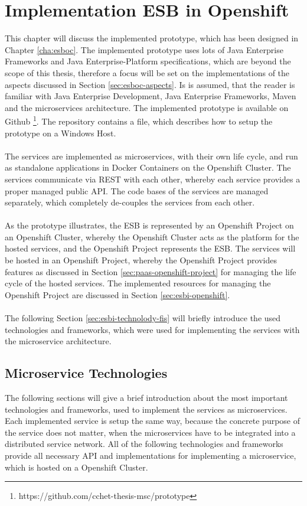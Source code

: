 \chapter{Implementation ESB in Openshift}
\label{cha:esbi}
This chapter will discuss the implemented prototype, which has been designed in Chapter \vref{cha:esboc}. The implemented prototype uses lots of Java Enterprise Frameworks and Java Enterprise-Platform specifications, which are beyond the scope of this thesis, therefore a focus will be set on the implementations of the aspects discussed in Section \vref{sec:esboc-aspects}. Is is assumed, that the reader is familiar with Java Enterprise Development, Java Enterprise Frameworks, Maven and the microservices architecture. The implemented prototype is available on Github \footnote{https://github.com/cchet-thesis-msc/prototype}. The repository contains a  file, which describes how to setup the prototype on a Windows Host. 
\\ \\
The services are implemented as microservices, with their own life cycle, and run as standalone applications in Docker Containers on the Openshift Cluster. The services communicate via REST with each other, whereby each service provides a proper managed public API. The code bases of the services are managed separately, which completely de-couples the services from each other.  
\\ \\
As the prototype illustrates, the ESB is represented by an Openshift Project on an Openshift Cluster, whereby the Openshift Cluster acts as the platform for the hosted services, and the Openshift Project represents the ESB. The services will be hosted in an Openshift Project, whereby the Openshift Project provides features as discussed in Section \vref{sec:paas-openshift-project} for managing the life cycle of the hosted services. The implemented resources for managing the Openshift Project are discussed in Section \vref{sec:esbi-openshift}.
\\ \\
The following Section \vref{sec:esbi-technolody-fis} will briefly introduce the used technologies and frameworks, which were used for implementing the services with the microservice architecture.

\section{Microservice Technologies}
\label{sec:esbi-technolody-fis}
The following sections will give a brief introduction about the most important technologies and frameworks, used to implement the services as microservices. Each implemented service is setup the same way, because the concrete purpose of the service does not matter, when the microservices have to be integrated into a distributed service network. All of the following technologies and frameworks provide all necessary API and implementations for implementing a microservice, which is hosted on a Openshift Cluster.

